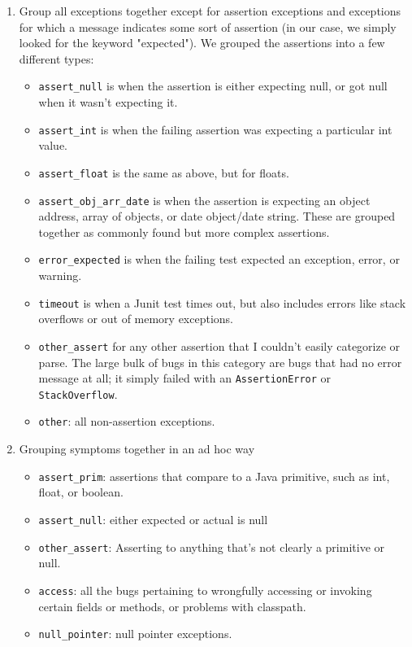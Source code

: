 \begin{enumerate}
	\item Group all exceptions together except for assertion exceptions and exceptions for which a message indicates some sort of assertion (in our case, we simply looked for the keyword "expected"). We grouped the assertions into a few different types:
	\begin{itemize}
		\item \lstinline{assert_null} is when the assertion is either expecting null, or got null when it wasn't expecting it.
		\item \lstinline{assert_int} is when the failing assertion was expecting a particular int value.
		\item \lstinline{assert_float} is the same as above, but for floats.
		\item \lstinline{assert_obj_arr_date} is when the assertion is expecting an object address, array of objects, or date object/date string. These are grouped together as commonly found but more complex assertions.
		\item \lstinline{error_expected} is when the failing test expected an exception, error, or warning.
		\item \lstinline{timeout} is when a Junit test times out, but also includes errors like stack overflows or out of memory exceptions.
		\item \lstinline{other_assert} for any other assertion that I couldn't easily categorize or parse. The large bulk of bugs in this category are bugs that had no error message at all; it simply failed with an \lstinline{AssertionError} or \lstinline{StackOverflow}.
		\item \lstinline{other}: all non-assertion exceptions.
	\end{itemize}
	\item Grouping symptoms together in an ad hoc way 
	\begin{itemize}
		\item \lstinline{assert_prim}: assertions that compare to a Java primitive, such as int, float, or boolean.
		\item \lstinline{assert_null}: either expected or actual is null
		\item \lstinline{other_assert}: Asserting to anything that's not clearly a primitive or null.
		\item \lstinline{access}: all the bugs pertaining to wrongfully accessing or invoking certain fields or methods, or problems with classpath.
		\item \lstinline{null_pointer}: null pointer exceptions.

\end{itemize}
\end{enumerate}
